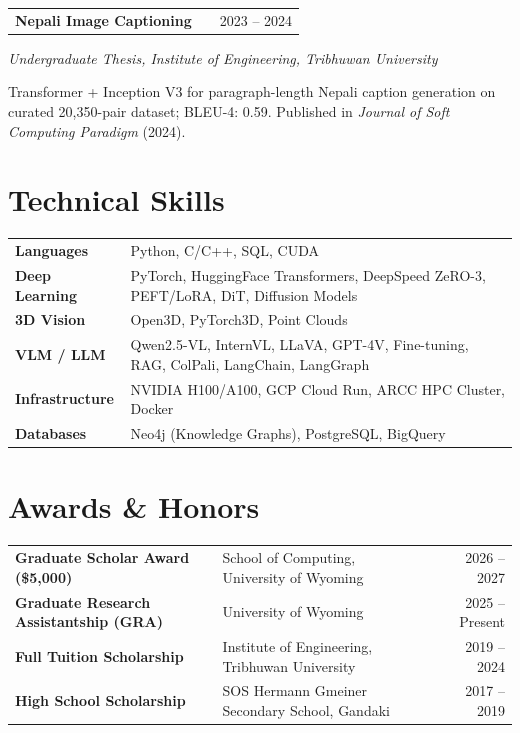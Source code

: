 \documentclass[a4paper,10pt]{article}
\makeatletter
\newenvironment{jobshort}[2]
    {
    \begin{tabularx}{\linewidth}{@{}l X r@{}}
    \textbf{#1} & \hfill & #2 \\[1.5pt]
    \end{tabularx}
    }
    {}
\makeatother
\begin{document}
\vspace{4pt}
\begin{jobshort}{Nepali Image Captioning \hfill \href{https://github.com/subedinab/major-project}{\faGithub}}{2023 -- 2024}
\textit{Undergraduate Thesis, Institute of Engineering, Tribhuwan University}
\begin{itemize}[itemsep=-5pt]
{
    \item Transformer + Inception V3 for paragraph-length Nepali caption generation on curated 20,350-pair dataset; BLEU-4: 0.59. Published in \textit{Journal of Soft Computing Paradigm} (2024).
}
\end{itemize}
\end{jobshort}

\section{Technical Skills}
\begin{tabularx}{\linewidth}{@{}l X@{}}
\textbf{Languages}       & Python, C/C++, SQL, CUDA  \\[2pt]
\textbf{Deep Learning}   & PyTorch, HuggingFace Transformers, DeepSpeed ZeRO-3, PEFT/LoRA, DiT, Diffusion Models \\[2pt]
\textbf{3D Vision}       & Open3D, PyTorch3D,  Point Clouds \\[2pt]
\textbf{VLM / LLM}       & Qwen2.5-VL, InternVL, LLaVA, GPT-4V, Fine-tuning, RAG, ColPali, LangChain, LangGraph \\[2pt]
\textbf{Infrastructure}  & NVIDIA H100/A100, GCP Cloud Run, ARCC HPC Cluster, Docker \\[2pt]
\textbf{Databases}       & Neo4j (Knowledge Graphs), PostgreSQL, BigQuery \\
\end{tabularx}

\section{Awards \& Honors}
\begin{tabularx}{\linewidth}{@{}l X r@{}}
\textbf{Graduate Scholar Award (\$5,000)} & School of Computing, University of Wyoming & 2026 -- 2027 \\[2pt]
\textbf{Graduate Research Assistantship (GRA)} & University of Wyoming & 2025 -- Present \\[2pt]
\textbf{Full Tuition Scholarship} & Institute of Engineering, Tribhuwan University & 2019 -- 2024 \\[2pt]
\textbf{High School Scholarship} & SOS Hermann Gmeiner Secondary School, Gandaki & 2017 -- 2019 \\
\end{tabularx}
\end{document}
